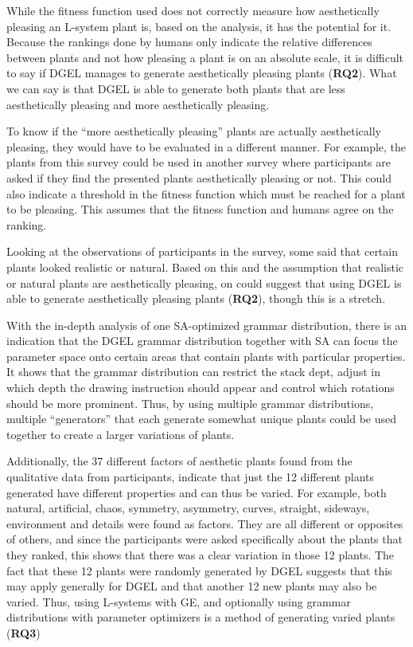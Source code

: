 While the fitness function used does not correctly measure how aesthetically pleasing an L-system plant is, based on the analysis, it has the potential for it.
Because the rankings done by humans only indicate the relative differences between plants and not how pleasing a plant is on an absolute scale, it is difficult to say if DGEL manages to generate aesthetically pleasing plants (\textbf{RQ2}).
What we can say is that DGEL is able to generate both plants that are less aesthetically pleasing and more aesthetically pleasing.

To know if the ``more aesthetically pleasing'' plants are actually aesthetically pleasing, they would have to be evaluated in a different manner.
For example, the plants from this survey could be used in another survey where participants are asked if they find the presented plants aesthetically pleasing or not.
This could also indicate a threshold in the fitness function which must be reached for a plant to be pleasing.
This assumes that the fitness function and humans agree on the ranking.

Looking at the observations of participants in the survey, some said that certain plants looked realistic or natural.
Based on this and the assumption that realistic or natural plants are aesthetically pleasing, on could suggest that using DGEL is able to generate aesthetically pleasing plants (\textbf{RQ2}), though this is a stretch.

With the in-depth analysis of one SA-optimized grammar distribution, there is an indication that the DGEL grammar distribution together with SA can focus the parameter space onto certain areas that contain plants with particular properties.
It shows that the grammar distribution can restrict the stack dept, adjust in which depth the drawing instruction should appear and control which rotations should be more prominent.
Thus, by using multiple grammar distributions, multiple ``generators'' that each generate somewhat unique plants could be used together to create a larger variations of plants.

Additionally, the 37 different factors of aesthetic plants found from the qualitative data from participants, indicate that just the 12 different plants generated have different properties and can thus be varied.
For example, both natural, artificial, chaos, symmetry, asymmetry, curves, straight, sideways, environment and details were found as factors.
They are all different or opposites of others, and since the participants were asked specifically about the plants that they ranked, this shows that there was a clear variation in those 12 plants.
The fact that these 12 plants were randomly generated by DGEL suggests that this may apply generally for DGEL and that another 12 new plants may also be varied.
Thus, using L-systems with GE, and optionally using grammar distributions with parameter optimizers is a method of generating varied plants (\textbf{RQ3})

